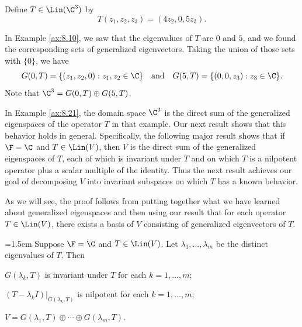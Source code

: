 \begin{example}\label{ax:8.21}
Define $T\in\Lin(\C^3)$ by
\[ T(z_1,z_2,z_3) = (4z_2,0,5z_3). \]

In Example \ref{ax:8.10}, we saw that the eigenvalues of $T$ are $0$ and $5$,
and we found the corresponding sets of generalized eigenvectors. Taking the
union of those sets with $\{0\}$, we have
\[ G(0,T) = \{(z_1,z_2,0) : z_1,z_2\in\C\} \quad\text{and}\quad
   G(5,T) = \{(0,0,z_3) : z_3\in\C\}. \]
Note that $\C^3=G(0,T)\oplus G(5,T)$.
\end{example}

In Example \ref{ax:8.21}, the domain space $\C^3$ is the direct sum of the
generalized eigenspaces of the operator $T$ in that example. Our next result
shows that this behavior holds in general. Specifically, the following major
result shows that if $\F=\C$ and $T\in\Lin(V)$, then $V$ is the direct sum of
the generalized eigenspaces of $T$, each of which is invariant under $T$ and on
which $T$ is a nilpotent operator plus a scalar multiple of the identity. Thus
the next result achieves our goal of decomposing $V$ into invariant subspaces on
which $T$ has a known behavior.

As we will see, the proof follows from putting together what we have learned
about generalized eigenspaces and then using our result that for each operator
$T\in\Lin(V)$, there exists a basis of $V$ consisting of generalized
eigenvectors of $T$.

\begin{result}\label{ax:8.22}\emergencystretch=1.5em
Suppose $\F=\C$ and $T\in\Lin(V)$. Let $\lambda_1,\dots,\lambda_m$ be the
distinct eigenvalues of $T$. Then
\begin{parts}
\item $G(\lambda_k,T)$ is invariant under $T$ for each $k=1,\dots,m$;
\item $(T-\lambda_kI)|_{G(\lambda_k,T)}$ is nilpotent for each
  $k=1,\dots,m$;
\item $V=G(\lambda_1,T)\oplus\cdots\oplus G(\lambda_m,T)$.
\end{parts}
\end{result}

